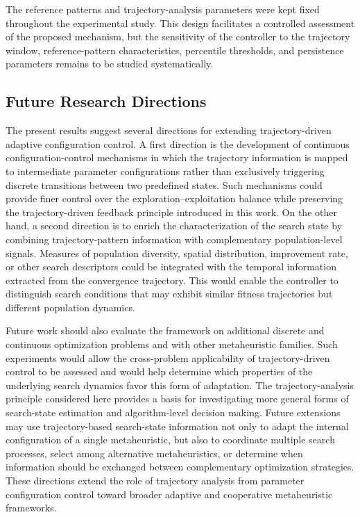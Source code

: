 \documentclass[journal,article,submit,moreauthors]{Definitions/mdpi}
\begin{document}
The reference patterns and trajectory-analysis parameters were
kept fixed throughout the experimental study. This design facilitates a
controlled assessment of the proposed mechanism, but the sensitivity of the
controller to the trajectory window, reference-pattern characteristics,
percentile thresholds, and persistence parameters remains to be studied
systematically.


\subsection{Future Research Directions}
\label{subsec:future_work}

The present results suggest several directions for extending
trajectory-driven adaptive configuration control. A first direction is the
development of continuous configuration-control mechanisms in which the
trajectory information is mapped to intermediate parameter configurations
rather than exclusively triggering discrete transitions between two
predefined states. Such mechanisms could provide finer control over the
exploration--exploitation balance while preserving the trajectory-driven
feedback principle introduced in this work. On the other hand, a second direction is to enrich the characterization of the search state by combining trajectory-pattern information with complementary population-level signals. Measures of population diversity, spatial distribution, improvement rate, or other search descriptors could be integrated with the temporal information extracted from the convergence trajectory. This would enable the controller to distinguish search conditions that may exhibit similar fitness trajectories but different population dynamics.

Future work should also evaluate the framework on additional discrete and
continuous optimization problems and with other metaheuristic families.
Such experiments would allow the cross-problem applicability of
trajectory-driven control to be assessed and would help determine which
properties of the underlying search dynamics favor this form of adaptation. The trajectory-analysis principle considered here provides a basis
for investigating more general forms of search-state estimation and
algorithm-level decision making. Future extensions may use trajectory-based
search-state information not only to adapt the internal configuration of a
single metaheuristic, but also to coordinate multiple search processes,
select among alternative metaheuristics, or determine when information
should be exchanged between complementary optimization strategies. These
directions extend the role of trajectory analysis from parameter
configuration control toward broader adaptive and cooperative
metaheuristic frameworks.
\end{document}
